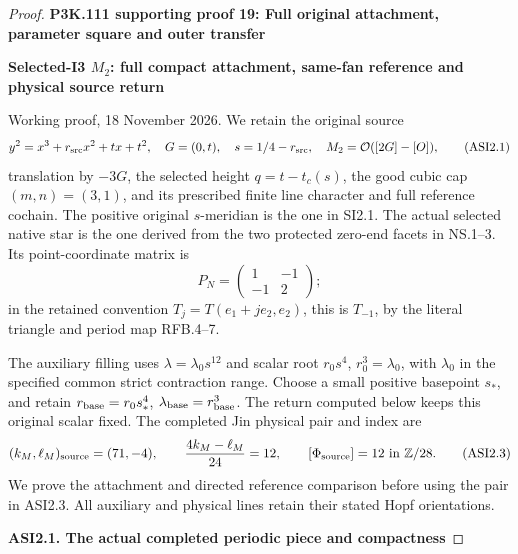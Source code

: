 \begin{proof}


\par\bigskip\noindent\textbf{P3K.111 supporting proof 19: Full original attachment, parameter square and outer transfer}\par\nobreak
\par

\medskip\noindent\textbf{Selected-I3 \(M_{2}\): full compact attachment, same-fan reference and physical source return}

\par\nobreak

Working proof, 18 November 2026. We retain the original source
\[
 y^2=x^3+r_{\rm src}x^2+tx+t^2,\quad G=(0,t),\quad
 s=1/4-r_{\rm src},\quad M_2=\mathcal O([2G]-[O]),
 \tag{ASI2.1}
\]
translation by \(-3G\), the selected height \(q=t-t_c(s)\),
the good cubic cap \((m,n)=(3,1)\), and its prescribed finite
line character and full reference cochain. The positive original
\(s\)-meridian is the one in SI2.1. The actual selected native
star is the one derived from the two protected zero-end facets
in NS.1--3. Its point-coordinate matrix is
\[
 P_N=\begin{pmatrix}1&-1\\-1&2\end{pmatrix};
 \tag{ASI2.2}
\]
in the retained convention \(T_j=T(e_1+je_2,e_2)\), this is
\(T_{-1}\), by the literal triangle and period map RFB.4--7.

The auxiliary filling uses \(\lambda=\lambda_0s^{12}\) and
scalar root \(r_0s^4\), \(r_0^3=\lambda_0\), with \(\lambda_0\)
in the specified common strict contraction range. Choose a
small positive basepoint \(s_*\), and retain
\(r_{\rm base}=r_0s_*^4\), \(\lambda_{\rm base}=r_{\rm base}^3\).
The return computed below keeps this original scalar fixed.
The completed Jin physical pair and index are
\[
 (k_M,\ell_M)_{\rm source}=(71,-4),\qquad
 \frac{4k_M-\ell_M}{24}=12,\qquad
                 [\Phi_{\rm source}]=12\ \hbox{in }\mathbb Z/28.
 \tag{ASI2.3}
\]
We prove the attachment and directed reference comparison before
using the pair in ASI2.3. All auxiliary and physical lines retain
their stated Hopf orientations.

\par

\medskip\noindent\textbf{ASI2.1. The actual completed periodic piece and compactness}

\par\nobreak


\end{proof}
